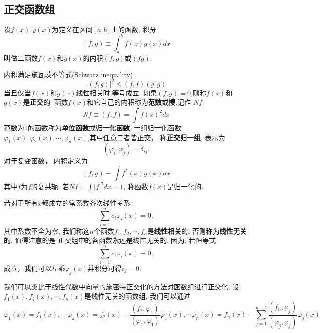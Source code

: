 \subsection{正交函数组}
\begin{definition}
  \label{def:orthogonal_function}
  设$f(x), g(x) $为定义在区间$[a,b]$上的函数, 积分
  \begin{equation}
    (f, g) \equiv \int_a^b f(x) g(x) dx
  \end{equation}
叫做二函数$f(x)$和$g(x)$的内积$(f,g)$或$(fg)$.
\end{definition}
内积满足施瓦茨不等式(Schwarz inequality)
\begin{equation}
  |(f,g)|^2 \leq (f,f)(g,g)
\end{equation}
当且仅当$f(x)$和$g(x)$线性相关时,等号成立.
如果$(f,g) = 0$,则称$f(x)$和$g(x)$是\textbf{正交}的. 函数$f(x)$和它自己的内积称为\textbf{范数}或\textbf{模},记作
$N f$,
\begin{equation}
  N f \equiv (f,f) = \int  f(x)^2 dx
\end{equation}
范数为1的函数称为\textbf{单位函数}或\textbf{归一化函数}. 一组归一化函数$\varphi_1(x), \varphi_2(x), \cdots, \varphi_n(x)$,其中任意二者皆正交，
称\textbf{正交归一组}, 表示为
\begin{equation}
  (\varphi_i, \varphi_j) = \delta_{ij} .
\end{equation}
对于复变函数， 内积定义为
\begin{equation}
  ( f, g ) = \int  f^*(x) g(x) dx
\end{equation}
其中$\bar f$为$f$的复共轭.  若$N f = \int | f|^2 dx = 1$, 称函数$f(x)$是归一化的. 

若对于所有$x$都成立的常系数齐次线性关系
\begin{equation}
  \sum_{i=1}^n c_i \varphi_i(x) = 0,
\end{equation}
其中系数不全为零, 我们称这$n$个函数$f_1, f_2, \cdots, f_n$是\textbf{线性相关}的. 否则称为\textbf{线性无关}的. 值得注意的是
正交组中的各函数永远是线性无关的. 因为, 若恒等式
\begin{equation}
  \sum_{i=1}^n c_i \varphi_i(x) = 0,
\end{equation}
成立，我们可以左乘$\varphi_j(x)$并积分可得$c_j = 0$.

我们可以类比于线性代数中向量的施密特正交化的方法对函数组进行正交化. 设$f_1(x), f_2(x), \cdots, f_n(x)$是线性无关的函数组, 我们可以通过
\begin{equation}
  \varphi_1(x) = f_1(x), \quad \varphi_2(x) = f_2(x) - \frac{(f_2, \varphi_1)}{(\varphi_1, \varphi_1)} \varphi_1(x), \cdots
  \varphi_n(x) = f_n(x) - \sum_{j=1}^{n-1} \frac{(f_n, \varphi_j)}{(\varphi_j, \varphi_j)} \varphi_j(x)
\end{equation}

